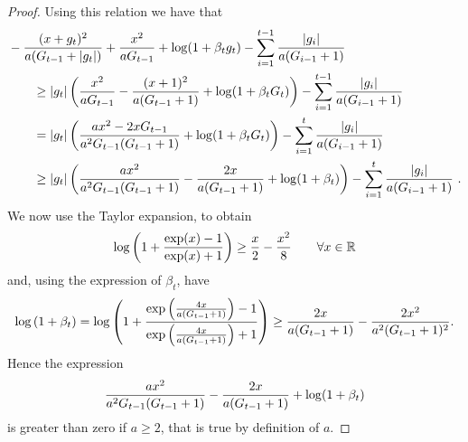 \begin{proof}
Using this relation we have that
\begin{align*}
&-\frac{(x+g_t)^2}{a (G_{t-1}+|g_t|)} + \frac{x^2}{a G_{t-1}}+\log(1+\beta_t g_t)-\sum_{i=1}^{t-1} \frac{|g_i|}{a (G_{i-1} + 1)} \\
&\qquad \geq |g_t| \left(\frac{x^2}{a G_{t-1}} - \frac{(x+1)^2}{a (G_{t-1} + 1)} + \log(1+\beta_t G_t)\right) - \sum_{i=1}^{t-1} \frac{|g_i|}{a (G_{i-1} + 1)}\\
&\qquad = |g_t| \left(\frac{a x^2 -2 x G_{t-1} }{a^2 G_{t-1}(G_{t-1} + 1)} + \log(1+\beta_t G_t)\right) - \sum_{i=1}^{t} \frac{|g_i|}{a (G_{i-1} + 1)}\\
&\qquad \geq |g_t| \left(\frac{a x^2}{a^2 G_{t-1}(G_{t-1} + 1)}-\frac{2 x}{a (G_{t-1} + 1)} + \log(1+\beta_t)\right) - \sum_{i=1}^{t} \frac{|g_i|}{a (G_{i-1} + 1)}~.
\end{align*}
We now use the Taylor expansion, to obtain
\[
\log\left(1+\frac{\exp(x)-1}{\exp(x)+1}\right) \geq \frac{x}{2} -\frac{x^2}{8} \qquad \forall x \in \mathbb{R}
\]
and, using the expression of $\beta_t$, have
\[
\log\left(1+\beta_t\right) 
= \log\left(1+\frac{\exp\left(\frac{4 x}{a (G_{t-1} + 1)}\right)-1}{\exp\left(\frac{4 x}{a (G_{t-1} + 1)}\right)+1}\right) 
\geq \frac{2 x}{a (G_{t-1} + 1)} -\frac{2 x^2}{a^2 (G_{t-1} + 1)^2}.
\]
Hence the expression 
\[
\frac{a x^2}{a^2 G_{t-1}(G_{t-1} + 1)}-\frac{2 x}{a (G_{t-1} + 1)} + \log(1+\beta_t)
\]
is greater than zero if $a \geq 2$, that is true by definition of $a$.
\end{proof}